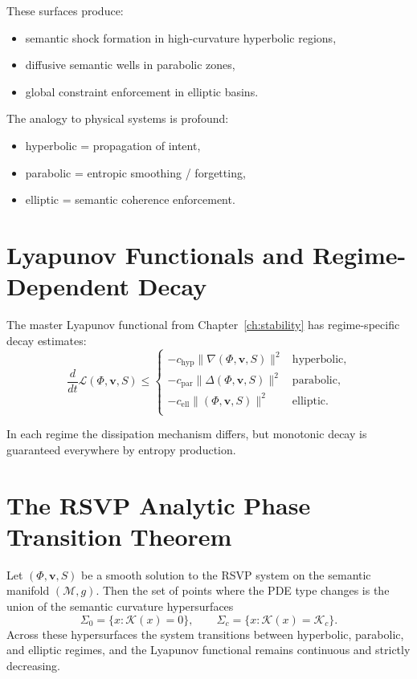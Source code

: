 These surfaces produce:
\begin{itemize}
\item semantic shock formation in high-curvature hyperbolic regions,
\item diffusive semantic wells in parabolic zones,
\item global constraint enforcement in elliptic basins.
\end{itemize}

The analogy to physical systems is profound:
\begin{itemize}
\item hyperbolic = propagation of intent,
\item parabolic = entropic smoothing / forgetting,
\item elliptic = semantic coherence enforcement.
\end{itemize}

\section{Lyapunov Functionals and Regime-Dependent Decay}

The master Lyapunov functional from Chapter~\ref{ch:stability}
has regime-specific decay estimates:
\[
\frac{d}{dt} \mathcal{L}(\Phi, \mathbf{v}, S)
\le
\begin{cases}
- c_\mathrm{hyp} \|\nabla(\Phi,\mathbf{v},S)\|^2 &\text{hyperbolic},\\[4pt]
- c_\mathrm{par} \|\Delta(\Phi,\mathbf{v},S)\|^2 &\text{parabolic},\\[4pt]
- c_\mathrm{ell} \|(\Phi,\mathbf{v},S)\|^2 &\text{elliptic}.\\
\end{cases}
\]

In each regime the dissipation mechanism differs,
but monotonic decay is guaranteed everywhere by entropy production.

\section{The RSVP Analytic Phase Transition Theorem}

\begin{theorem}
Let $(\Phi, \mathbf{v}, S)$ be a smooth solution to the RSVP system on the
semantic manifold $(\mathcal{M},g)$.
Then the set of points where the PDE type changes is the union of the
semantic curvature hypersurfaces
\[
\Sigma_0 = \{x: \mathcal{K}(x)=0\},
\qquad
\Sigma_c = \{x: \mathcal{K}(x)=\mathcal{K}_c\}.
\]
Across these hypersurfaces the system transitions between
hyperbolic, parabolic, and elliptic regimes,
and the Lyapunov functional remains continuous and strictly decreasing.
\end{theorem}

